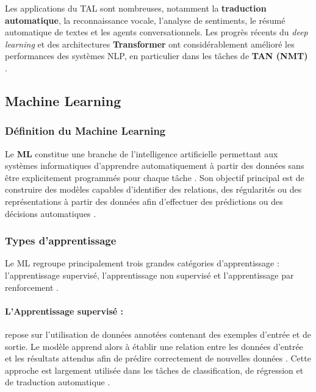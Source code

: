 Les applications du \ac{TAL} sont nombreuses, notamment la \textbf{traduction automatique}, la reconnaissance vocale, l'analyse de sentiments, le résumé automatique de textes et les agents conversationnels. Les progrès récents du \textit{deep learning} et des architectures \textbf{Transformer} ont considérablement amélioré les performances des systèmes \ac{NLP}, en particulier dans les tâches de \textbf{TAN (\ac{NMT})} \cite{vaswani2017attention, ranathunga2023neural, agyei2025dynamic}.

\subsection{Machine Learning}

\subsubsection{Définition du Machine Learning}

Le \textbf{\ac{ML}} constitue une branche de l'intelligence artificielle permettant aux systèmes informatiques d'apprendre automatiquement à partir des données sans être explicitement programmés pour chaque tâche \cite{Goodfellow-et-al-2016}. Son objectif principal est de construire des modèles capables d'identifier des relations, des régularités ou des représentations à partir des données afin d'effectuer des prédictions ou des décisions automatiques \cite{Goodfellow-et-al-2016}.

\subsubsection{Types d'apprentissage}

Le \ac{ML} regroupe principalement trois grandes catégories d'apprentissage : l'apprentissage supervisé, l'apprentissage non supervisé et l'apprentissage par renforcement \cite{Goodfellow-et-al-2016}.

\paragraph{L'Apprentissage supervisé :}

 repose sur l'utilisation de données annotées contenant des exemples d'entrée et de sortie. Le modèle apprend alors à établir une relation entre les données d'entrée et les résultats attendus afin de prédire correctement de nouvelles données \cite{Goodfellow-et-al-2016}. Cette approche est largement utilisée dans les tâches de classification, de régression et de traduction automatique \cite{ranathunga2023neural}.

